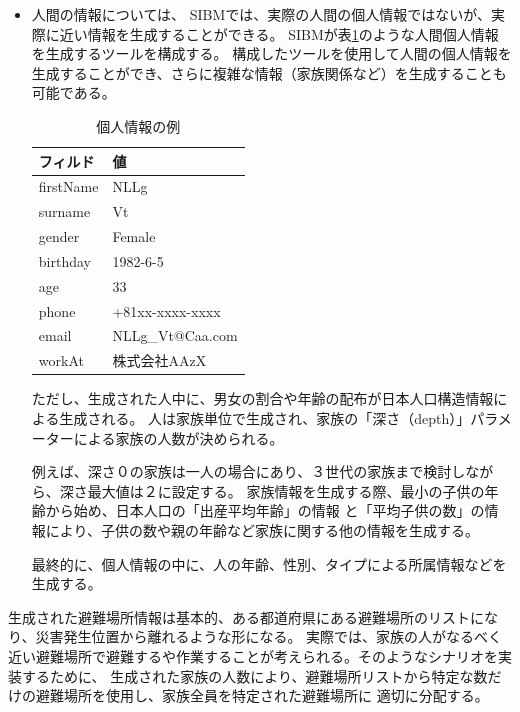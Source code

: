 \begin{itemize}
	\item
	人間の情報については、
	SIBMでは、実際の人間の個人情報ではないが、実際に近い情報を生成することができる。
	SIBMが表\ref{table:data_person}のような人間個人情報を生成するツールを構成する。
	構成したツールを使用して人間の個人情報を生成することができ、さらに複雑な情報（家族関係など）を生成することも可能である。
	
	\begin{table}[h]
	\begin{center}
	\begin{tabular}{| l | p{72mm} |}
		\hline
		\rowstyle{\bfseries}
		フィルド & 値 \\
		\hline
		firstName & NLLg \\
		\hline
		surname & Vt \\
		\hline
		gender & Female \\
		\hline
		birthday & 1982-6-5 \\
		\hline
		age & 33 \\
		\hline
		phone & +81xx-xxxx-xxxx \\
		\hline
		email & NLLg\_Vt@Caa.com \\
		\hline
		workAt & 株式会社AAzX \\
		\hline
	\end{tabular}
	\caption{個人情報の例}
	\label{table:data_person}
	\end{center}
	\end{table}
	
	ただし、生成された人中に、男女の割合や年齢の配布が日本人口構造情報による生成される。
	人は家族単位で生成され、家族の「深さ（depth）」パラメーターによる家族の人数が決められる。
	
	例えば、深さ０の家族は一人の場合にあり、３世代の家族まで検討しながら、深さ最大値は２に設定する。
	家族情報を生成する際、最小の子供の年齢から始め、日本人口の「出産平均年齢」の情報
	と「平均子供の数」の情報により、子供の数や親の年齢など家族に関する他の情報を生成する。
	
	最終的に、個人情報の中に、人の年齢、性別、タイプによる所属情報などを生成する。
	
\end{itemize}

生成された避難場所情報は基本的、ある都道府県にある避難場所のリストになり、災害発生位置から離れるような形になる。
実際では、家族の人がなるべく近い避難場所で避難するや作業することが考えられる。そのようなシナリオを実装するために、
生成された家族の人数により、避難場所リストから特定な数だけの避難場所を使用し、家族全員を特定された避難場所に
適切に分配する。

